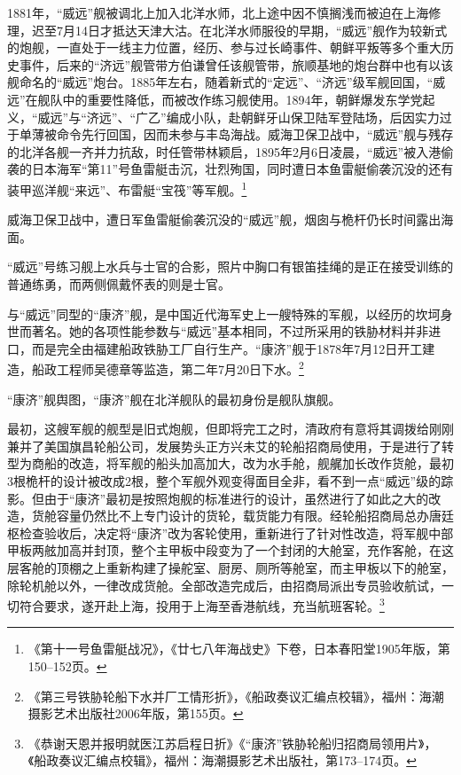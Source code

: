 \documentclass[12pt,UTF8]{ctexbook}
\begin{document}
1881年，“威远”舰被调北上加入北洋水师，北上途中因不慎搁浅而被迫在上海修理，迟至7月14日才抵达天津大沽。在北洋水师服役的早期，“威远”舰作为较新式的炮舰，一直处于一线主力位置，经历、参与过长崎事件、朝鲜平叛等多个重大历史事件，后来的“济远”舰管带方伯谦曾任该舰管带，旅顺基地的炮台群中也有以该舰命名的“威远”炮台。1885年左右，随着新式的“定远”、“济远”级军舰回国，“威远”在舰队中的重要性降低，而被改作练习舰使用。1894年，朝鲜爆发东学党起义，“威远”与“济远”、“广乙”编成小队，赴朝鲜牙山保卫陆军登陆场，后因实力过于单薄被命令先行回国，因而未参与丰岛海战。威海卫保卫战中，“威远”舰与残存的北洋各舰一齐并力抗敌，时任管带林颖启，1895年2月6日凌晨，“威远”被入港偷袭的日本海军“第11”号鱼雷艇击沉，壮烈殉国，同时遭日本鱼雷艇偷袭沉没的还有装甲巡洋舰“来远”、布雷艇“宝筏”等军舰。\footnote{《第十一号鱼雷艇战况》，《廿七八年海战史》下卷，日本春阳堂1905年版，第150--152页。}

威海卫保卫战中，遭日军鱼雷艇偷袭沉没的“威远”舰，烟囱与桅杆仍长时间露出海面。

“威远”号练习舰上水兵与士官的合影，照片中胸口有银笛挂绳的是正在接受训练的普通练勇，而两侧佩戴怀表的则是士官。

与“威远”同型的“康济”舰，是中国近代海军史上一艘特殊的军舰，以经历的坎坷身世而著名。她的各项性能参数与“威远”基本相同，不过所采用的铁胁材料并非进口，而是完全由福建船政铁胁工厂自行生产。“康济”舰于1878年7月12日开工建造，船政工程师吴德章等监造，第二年7月20日下水。\footnote{《第三号铁胁轮船下水并厂工情形折》，《船政奏议汇编点校辑》，福州：海潮摄影艺术出版社2006年版，第155页。}

“康济”舰舆图，“康济”舰在北洋舰队的最初身份是舰队旗舰。

最初，这艘军舰的舰型是旧式炮舰，但即将完工之时，清政府有意将其调拨给刚刚兼并了美国旗昌轮船公司，发展势头正方兴未艾的轮船招商局使用，于是进行了转型为商船的改造，将军舰的船头加高加大，改为水手舱，舰艉加长改作货舱，最初3根桅杆的设计被改成2根，整个军舰外观变得面目全非，看不到一点“威远”级的踪影。但由于“康济”最初是按照炮舰的标准进行的设计，虽然进行了如此之大的改造，货舱容量仍然比不上专门设计的货轮，载货能力有限。经轮船招商局总办唐廷枢检查验收后，决定将“康济”改为客轮使用，重新进行了针对性改造，将军舰中部甲板两舷加高并封顶，整个主甲板中段变为了一个封闭的大舱室，充作客舱，在这层客舱的顶棚之上重新构建了操舵室、厨房、厕所等舱室，而主甲板以下的舱室，除轮机舱以外，一律改成货舱。全部改造完成后，由招商局派出专员验收航试，一切符合要求，遂开赴上海，投用于上海至香港航线，充当航班客轮。\footnote{《恭谢天恩并报明就医江苏启程日折》《“康济”铁胁轮船归招商局领用片》，《船政奏议汇编点校辑》，福州：海潮摄影艺术出版社，第173--174页。}
\end{document}
